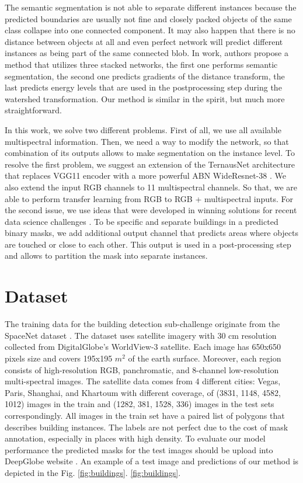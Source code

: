 \documentclass[10pt,twocolumn,letterpaper]{article}
\begin{document}
The semantic segmentation is not able to separate different instances because the predicted boundaries are usually not fine and closely packed objects of the same class collapse into one connected component. It may also happen that there is no distance between objects at all and even perfect network will predict different instances as being part of the same connected blob. In work, \cite{bai2017deep} authors propose a method that utilizes three stacked networks, the first one performs semantic segmentation, the second one predicts gradients of the distance transform, the last predicts energy levels that are used in the postprocessing step during the watershed transformation. Our method is similar in the spirit, but much more straightforward. 

In this work, we solve two different problems. First of all, we  use all available multispectral information. Then, we need a way to modify the network, so that combination of its outputs  allows to make segmentation on the instance level. To resolve the first problem, we suggest an extension of the TernausNet architecture \cite{iglovikov2018ternausnet} that replaces VGG11 encoder with a more powerful ABN WideResnet-38 \cite{bulo2017place}. We also extend the input RGB channels to 11 multispectral channels. So that, we are able to perform transfer learning from RGB to RGB + multispectral inputs. For the second issue, we use ideas that were developed in winning solutions for recent data science challenges \cite{goldberg2018urban, dsbowl2018}. To be specific and separate buildings in a predicted binary masks, we add additional output channel that predicts areas where objects are touched or close to each other. This output is used in a post-processing step and allows to partition the mask into separate instances. 





\section{Dataset}
The training data for the building detection sub-challenge originate from the SpaceNet dataset \cite{spacenet_dataset}. The dataset uses satellite imagery with 30 cm resolution collected from DigitalGlobe's WorldView-3 satellite. Each image has 650x650 pixels size and covers 195x195 $m^2$ of the earth surface. Moreover, each region consists of high-resolution RGB, panchromatic, and 8-channel low-resolution multi-spectral images. The satellite data comes from 4 different cities: Vegas, Paris, Shanghai, and Khartoum with different coverage, of  (3831, 1148, 4582, 1012) images in the train and (1282, 381, 1528, 336) images in the test sets correspondingly. All images in the train set have a paired list of polygons that describes building instances. The labels are not perfect due to the cost of mask annotation, especially in places with high density. To evaluate our model performance the predicted masks for the test images should be upload into DeepGlobe website \cite{deepglobe_website, demir2018deepglobe}. An example of a test image and predictions of our method is depicted in the Fig. \ref{fig:buildings}. \ref{fig:buildings}.
\end{document}
